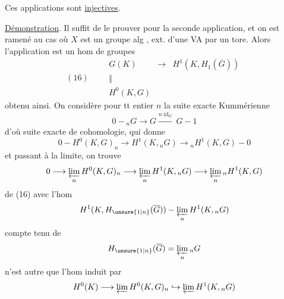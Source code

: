 Ces applications sont \uline{injectives}.

\uline{Démonstration}. Il suffit de le prouver pour la seconde application, et on est ramené au cas où $X$ est  un groupe alg , ext. d'une VA par un tore. Alors l'application est un hom de groupes
\[
(16)\qquad
\begin{array}{ccl}
G(K)&\longrightarrow&H^1(K,H_1(\overline G))\\[-.5ex]
\Vert&&\\[-.5ex]
H^0(K,G)&&
\end{array}
\]
obtenu ainsi. On considère pour tt entier $n$ la suite exacte Kummérienne
\[
0-{}_nG\longrightarrow G\xrightarrow{n\operatorname{id}_G}G-1
\]
d'où suite exacte de cohomologie, qui donne
\[
0-H^0(K,G)_n\longrightarrow H^1(K,{}_nG)\longrightarrow {}_nH^1(K,G)-0
\]
et passant à la limite, on trouve
\[
0\longrightarrow\varprojlim_n H^0(K,G)_n\longrightarrow\varprojlim_n H^1(K,{}_nG)\longrightarrow\varprojlim_n {}_nH^1(K,G)
\]
  de (16) avec l'hom  
\[
H^1(K,H_{\unsure{1|n}}(\overline G))-\varprojlim_n H^1(K,{}_nG)
\]
compte tenu de
\[
H_{\unsure{1|n}}(\overline G)=\varprojlim_n {}_nG
\]
n'est autre que l'hom induit par
\[
H^0(K)\longrightarrow\varprojlim H^0(K,G)_n\hookrightarrow\varprojlim H^1(K,{}_nG)
\]
